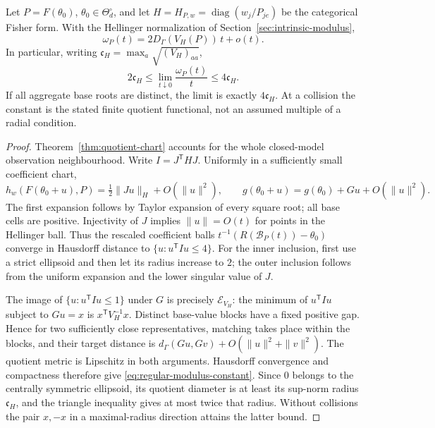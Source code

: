 \begin{theorem}
\label{thm:regular-modulus-bridge}
Let $P=F(\theta_0)$, $\theta_0\in\Theta_d^\circ$, and let
$H=H_{P,w}=\operatorname{diag}(w_j/P_{je})$ be the categorical Fisher
form. With the Hellinger normalization of
Section~\ref{sec:intrinsic-modulus},
\begin{equation}\label{eq:regular-modulus-constant}
 \omega_P(t)=2D_\Gamma(V_H(P))\,t+o(t).
\end{equation}
In particular, writing $\mathfrak c_H=\max_a\sqrt{(V_H)_{aa}}$,
\[
 2\mathfrak c_H\le
       \lim_{t\downarrow0}\frac{\omega_P(t)}t
       \le4\mathfrak c_H.
\]
If all aggregate base roots are distinct, the limit is exactly
$4\mathfrak c_H$. At a collision the constant is the stated finite
quotient functional, not an assumed multiple of a radial condition.
\end{theorem}
\begin{proof}
Theorem~\ref{thm:quotient-chart} accounts for the whole closed-model
observation neighbourhood. Write $I=J^{\mathsf T}HJ$. Uniformly in
a sufficiently small coefficient chart,
\[
 h_w(F(\theta_0+u),P)
       =\tfrac12\|Ju\|_H+O(\|u\|^2),\qquad
 g(\theta_0+u)=g(\theta_0)+Gu+O(\|u\|^2).
\]
The first expansion follows by Taylor expansion of every square root;
all base cells are positive. Injectivity of $J$ implies $\|u\|=O(t)$
for points in the Hellinger ball. Thus the rescaled coefficient balls
$t^{-1}(R(\mathcal B_P(t))-\theta_0)$ converge in Hausdorff distance
to $\{u:u^{\mathsf T}Iu\le4\}$. For the inner inclusion, first use
a strict ellipsoid and then let its radius increase to $2$; the outer
inclusion follows from the uniform expansion and the lower singular
value of $J$.

The image of $\{u:u^{\mathsf T}Iu\le1\}$ under $G$ is precisely
$\mathcal E_{V_H}$: the minimum of $u^{\mathsf T}Iu$ subject to
$Gu=x$ is $x^{\mathsf T}V_H^{-1}x$. Distinct base-value blocks have a
fixed positive gap. Hence for two sufficiently close representatives,
matching takes place within the blocks, and their target distance is
$d_\Gamma(Gu,Gv)+O(\|u\|^2+\|v\|^2)$. The quotient metric is
Lipschitz in both arguments. Hausdorff convergence and compactness
therefore give \eqref{eq:regular-modulus-constant}. Since $0$ belongs
to the centrally symmetric ellipsoid, its quotient diameter is at
least its sup-norm radius $\mathfrak c_H$, and the triangle inequality
gives at most twice that radius. Without collisions the pair $x,-x$
in a maximal-radius direction attains the latter bound.
\end{proof}

